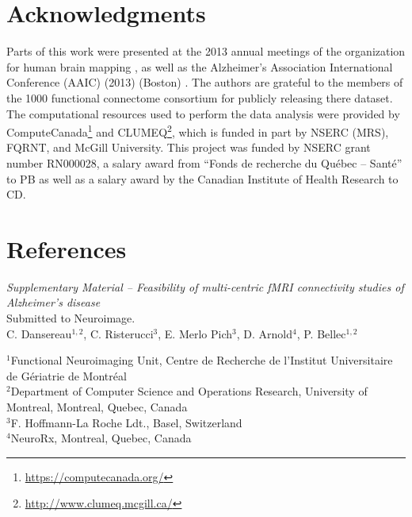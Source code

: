 \documentclass[authoryear]{elsarticle}
\begin{document}
\section{Acknowledgments}
Parts of this work were presented at the 2013 annual meetings of the organization for human brain mapping \citep{Dansereau2013}, as well as the  Alzheimer's Association International Conference (AAIC) (2013) (Boston) \citep{Dansereau2013a}. The authors are grateful to the members of the 1000 functional connectome consortium for publicly releasing there dataset. The computational resources used to perform the data analysis were provided by ComputeCanada\footnote{\url{https://computecanada.org/}} and CLUMEQ\footnote{\url{http://www.clumeq.mcgill.ca/}}, which is funded in part by NSERC (MRS), FQRNT, and McGill University. This project was funded by NSERC grant number RN000028, a salary award from ``Fonds de recherche du Qu\'ebec -- Sant\'e'' to PB as well as a salary award by the Canadian Institute of Health Research to CD.

\section*{References}





\pagebreak



\clearpage
\appendix


\clearpage
\pagebreak
\renewcommand{\thefigure}{S\arabic{figure}}
\renewcommand{\thetable}{S\arabic{table}}
\setcounter{figure}{0}
\begin{center}
\emph{Supplementary Material {--} Feasibility of multi-centric fMRI connectivity studies of Alzheimer's disease}\\

\vspace{\baselineskip}Submitted to Neuroimage.\\

\vspace{\baselineskip}C. Dansereau$^{1,2}$,  C. Risterucci$^{3}$, E. Merlo Pich$^{3}$, D. Arnold$^{4}$, P. Bellec$^{1,2}$\\

\end{center}
$^1$Functional Neuroimaging Unit, Centre de Recherche de l'Institut Universitaire de G\'eriatrie de Montr\'eal\\
$^2$Department of Computer Science and Operations Research, University of Montreal, Montreal, Quebec, Canada\\
$^3$F. Hoffmann-La Roche Ldt., Basel, Switzerland\\
$^4$NeuroRx, Montreal, Quebec, Canada\\
\end{document}
